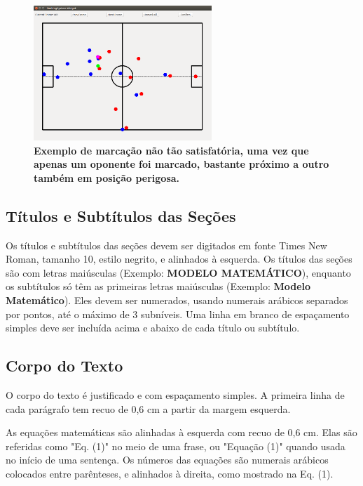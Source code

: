 \documentclass[10pt,fleqn,a4paper]{article}
\begin{document}
\begin{figure}[H]
	\centering
	\includegraphics[width=0.6\textwidth]{figures/frame461.png}
   \caption{\textbf{Exemplo de marcação não tão satisfatória, uma vez que apenas um oponente foi marcado, bastante próximo a outro também em posição perigosa.}} \label{fig:frame461}
\end{figure}

    \subsection{Títulos e Subtítulos das Seções }

        Os títulos e subtítulos das seções devem ser digitados em fonte Times New Roman, tamanho 10, estilo negrito, e alinhados à esquerda. Os títulos das seções são com letras maiúsculas (Exemplo: \textbf{MODELO MATEMÁTICO}), enquanto os subtítulos só têm as primeiras letras maiúsculas (Exemplo: \textbf{Modelo Matemático}). Eles devem ser numerados, usando numerais arábicos separados por pontos, até o máximo de 3 subníveis. Uma linha em branco de espaçamento simples deve ser incluída acima e abaixo de cada título ou subtítulo.

    \subsection{Corpo do Texto}

        O corpo do texto é justificado e com espaçamento simples. A primeira linha de cada parágrafo tem recuo de 0,6 cm a partir da margem esquerda.

        As equações matemáticas são alinhadas à esquerda com recuo de 0,6 cm.  Elas são referidas como "Eq. (1)" no meio de uma frase, ou "Equação (1)" quando usada no início de uma sentença. Os números das equações são numerais arábicos colocados entre parênteses, e alinhados à direita, como mostrado na Eq. (1).
\end{document}
